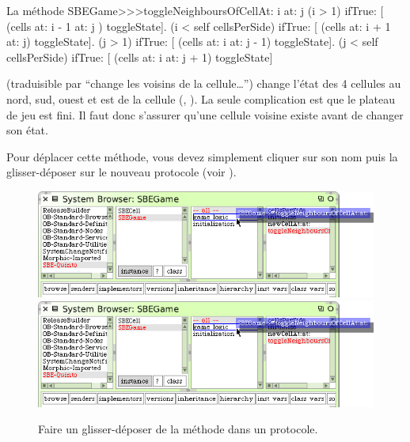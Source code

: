 \documentclass[a4paper,10pt,twoside]{book}
\begin{document}
\begin{method}[toggleNeighboursOfCellAt:at:]{La méthode \callback}
SBEGame>>>toggleNeighboursOfCellAt: i at: j
   (i > 1) ifTrue: [ (cells at: i - 1 at: j ) toggleState].
   (i < self cellsPerSide) ifTrue: [ (cells at: i + 1 at: j) toggleState].
   (j > 1) ifTrue: [ (cells at: i  at: j - 1) toggleState].
   (j < self cellsPerSide) ifTrue: [ (cells at: i at: j + 1) toggleState]
\end{method}

 (traduisible par ``change les
voisins de la cellule\ldots'') change l'état des 4 cellules au nord, sud, ouest et est de la cellule (, ). La seule complication est que le plateau de jeu est fini. Il faut donc s'assurer qu'une cellule voisine existe avant de changer son état.

Pour déplacer cette méthode, vous devez simplement cliquer sur son nom
puis la glisser-déposer sur le nouveau protocole (voir ).

\begin{figure}[htbp]
   \centering
   \ifluluelse
		{\includegraphics[width=\textwidth]{DragMethod} }
		{\includegraphics[scale=0.7]{DragMethod} }
   \caption{Faire un glisser-déposer de la méthode dans un protocole.\label{fig:dragMethod}}
\end{figure}
\end{document}

